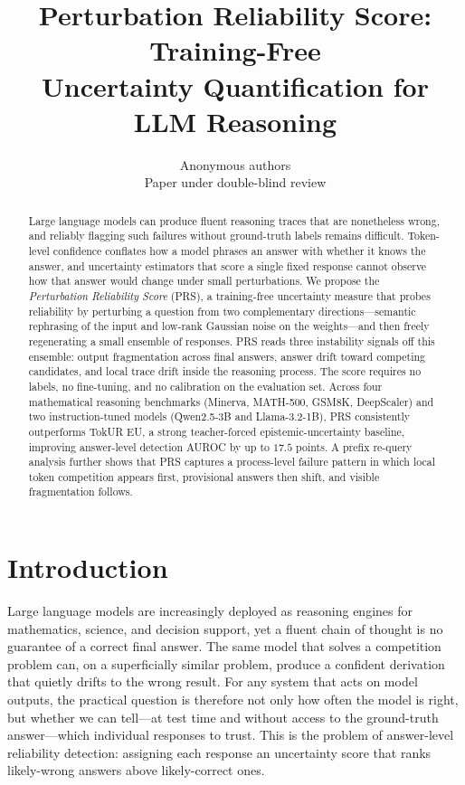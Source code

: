\documentclass{article} %
\title{Perturbation Reliability Score: Training-Free \\ Uncertainty Quantification for LLM Reasoning}
\author{Anonymous authors\\
Paper under double-blind review}
\begin{document}
\maketitle

\begin{abstract}
Large language models can produce fluent reasoning traces that are nonetheless
wrong, and reliably flagging such failures without ground-truth labels remains
difficult. Token-level confidence conflates how a model phrases an answer with
whether it knows the answer, and uncertainty estimators that score a single
fixed response cannot observe how that answer would change under small
perturbations. We propose the \emph{Perturbation Reliability Score} (PRS), a
training-free uncertainty measure that probes reliability by perturbing a
question from two complementary directions---semantic rephrasing of the input
and low-rank Gaussian noise on the weights---and then freely regenerating a
small ensemble of responses. PRS reads three instability signals off this
ensemble: output fragmentation across final answers, answer drift toward
competing candidates, and local trace drift inside the reasoning process.
The score requires no labels, no fine-tuning, and no calibration on the
evaluation set. Across four mathematical reasoning benchmarks (Minerva,
MATH-500, GSM8K, DeepScaler) and two instruction-tuned models (Qwen2.5-3B and
Llama-3.2-1B), PRS consistently outperforms TokUR EU, a strong teacher-forced
epistemic-uncertainty baseline, improving answer-level detection AUROC by up to
$17.5$ points. A prefix re-query analysis further shows that PRS captures a
process-level failure pattern in which local token competition appears first,
provisional answers then shift, and visible fragmentation follows.
\end{abstract}


\section{Introduction}
\label{sec:intro}

Large language models are increasingly deployed as reasoning engines for
mathematics, science, and decision support, yet a fluent chain of thought is no
guarantee of a correct final answer. The same model that solves a competition
problem can, on a superficially similar problem, produce a confident derivation
that quietly drifts to the wrong result. For any system that acts on model
outputs, the practical question is therefore not only how often the model is
right, but whether we can tell---at test time and without access to the
ground-truth answer---which individual responses to trust. This is the problem
of answer-level reliability detection: assigning each response an uncertainty
score that ranks likely-wrong answers above likely-correct ones.
\end{document}
